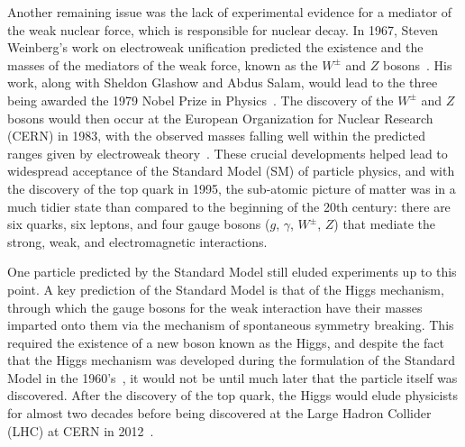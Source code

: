 Another remaining issue was the lack of experimental evidence for a mediator of the weak nuclear force, which is responsible for nuclear decay.
In 1967, Steven Weinberg's work on electroweak unification predicted the existence and the masses of the mediators of the weak force, known as the $W^\pm$ and $Z$ bosons~\cite{PhysRevLett.19.1264}.
His work, along with Sheldon Glashow and Abdus Salam, would lead to the three being awarded the 1979 Nobel Prize in Physics~\cite{NobelPrize:1979-Physics}.
The discovery of the $W^\pm$ and $Z$ bosons would then occur at the European Organization for Nuclear Research (CERN) in 1983, with the observed masses falling well within the predicted ranges given by electroweak theory~\cite{Arnison1983103,Arnison1983398}.
These crucial developments helped lead to widespread acceptance of the Standard Model (SM) of particle physics, and with the discovery of the top quark in 1995, the sub-atomic picture of matter was in a much tidier state than compared to the beginning of the 20th century: there are six quarks, six leptons, and four gauge bosons ($g$, $\gamma$, $W^\pm$, $Z$) that mediate the strong, weak, and electromagnetic interactions.

One particle predicted by the Standard Model still eluded experiments up to this point.
A key prediction of the Standard Model is that of the Higgs mechanism, through which the gauge bosons for the weak interaction have their masses imparted onto them via the mechanism of spontaneous symmetry breaking.
This required the existence of a new boson known as the Higgs, and despite the fact that the Higgs mechanism was developed during the formulation of the Standard Model in the 1960's~\cite{PhysRevLett.13.508}, it would not be until much later that the particle itself was discovered.
After the discovery of the top quark, the Higgs would elude physicists for almost two decades before being discovered at the Large Hadron Collider (LHC) at CERN in 2012~\cite{20121,201230}.

